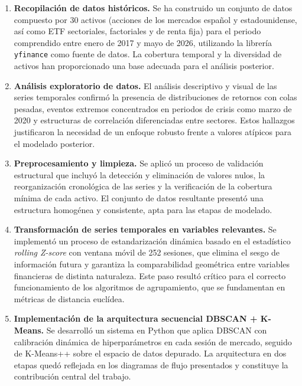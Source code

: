 \begin{enumerate}

    \item \textbf{Recopilación de datos históricos.} Se ha construido 
    un conjunto de datos compuesto por 30 activos (acciones de los 
    mercados español y estadounidense, así como ETF sectoriales, 
    factoriales y de renta fija) para el periodo comprendido entre 
    enero de 2017 y mayo de 2026, utilizando la librería 
    \texttt{yfinance} como fuente de datos. La cobertura temporal y la 
    diversidad de activos han proporcionado una base adecuada para el 
    análisis posterior.

    \item \textbf{Análisis exploratorio de datos.} El análisis 
    descriptivo y visual de las series temporales confirmó la presencia 
    de distribuciones de retornos con colas pesadas, eventos extremos 
    concentrados en periodos de crisis como marzo de 2020 y estructuras 
    de correlación diferenciadas entre sectores. Estos hallazgos 
    justificaron la necesidad de un enfoque robusto frente a valores 
    atípicos para el modelado posterior.

    \item \textbf{Preprocesamiento y limpieza.} Se aplicó un proceso de 
    validación estructural que incluyó la detección y eliminación de 
    valores nulos, la reorganización cronológica de las series y la 
    verificación de la cobertura mínima de cada activo. El conjunto de 
    datos resultante presentó una estructura homogénea y consistente, 
    apta para las etapas de modelado.

    \item \textbf{Transformación de series temporales en variables 
    relevantes.} Se implementó un proceso de estandarización dinámica 
    basado en el estadístico \textit{rolling Z-score} con ventana móvil 
    de 252 sesiones, que elimina el sesgo de información futura y 
    garantiza la comparabilidad geométrica entre variables financieras 
    de distinta naturaleza. Este paso resultó crítico para el correcto 
    funcionamiento de los algoritmos de agrupamiento, que se 
    fundamentan en métricas de distancia euclídea.

    \item \textbf{Implementación de la arquitectura secuencial DBSCAN + 
    K-Means.} Se desarrolló un sistema en Python que aplica DBSCAN con 
    calibración dinámica de hiperparámetros en cada sesión de mercado, 
    seguido de K-Means++ sobre el espacio de datos depurado. La 
    arquitectura en dos etapas quedó reflejada en los diagramas de 
    flujo presentados y constituye la contribución central del trabajo.


\end{enumerate}
